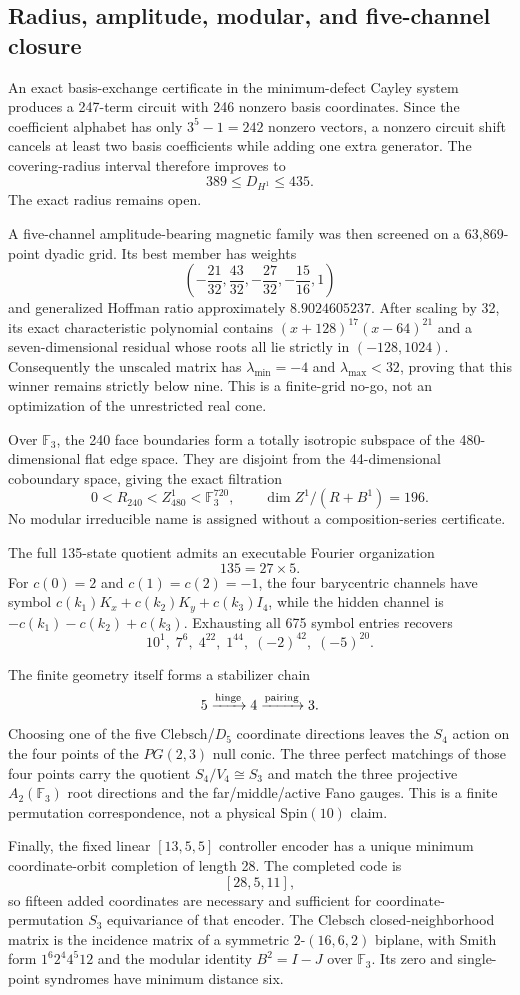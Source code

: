\subsection{Radius, amplitude, modular, and five-channel closure}
\label{sec:bt3486-3499}

An exact basis-exchange certificate in the minimum-defect Cayley system produces a
247-term circuit with 246 nonzero basis coordinates.  Since the coefficient alphabet
has only $3^5-1=242$ nonzero vectors, a nonzero circuit shift cancels at least two
basis coefficients while adding one extra generator.  The covering-radius interval
therefore improves to
\[
  \boxed{389\leq D_{H^1}\leq435}.
\]
The exact radius remains open.

A five-channel amplitude-bearing magnetic family was then screened on a 63,869-point
dyadic grid.  Its best member has weights
\[
 \left(-\frac{21}{32},\frac{43}{32},-\frac{27}{32},-\frac{15}{16},1\right)
\]
and generalized Hoffman ratio approximately $8.9024605237$.  After scaling by 32,
its exact characteristic polynomial contains $(x+128)^{17}(x-64)^{21}$ and a
seven-dimensional residual whose roots all lie strictly in $(-128,1024)$.
Consequently the unscaled matrix has $\lambda_{\min}=-4$ and
$\lambda_{\max}<32$, proving that this winner remains strictly below nine.  This is
a finite-grid no-go, not an optimization of the unrestricted real cone.

Over $\mathbb F_3$, the 240 face boundaries form a totally isotropic subspace of the
480-dimensional flat edge space.  They are disjoint from the 44-dimensional
coboundary space, giving the exact filtration
\[
  0<R_{240}<Z^1_{480}<\mathbb F_3^{720},\qquad
  \dim Z^1/(R+B^1)=196.
\]
No modular irreducible name is assigned without a composition-series certificate.

The full 135-state quotient admits an executable Fourier organization
\[
  135=27\times5.
\]
For $c(0)=2$ and $c(1)=c(2)=-1$, the four barycentric channels have symbol
$c(k_1)K_x+c(k_2)K_y+c(k_3)I_4$, while the hidden channel is
$-c(k_1)-c(k_2)+c(k_3)$.  Exhausting all 675 symbol entries recovers
\[
  10^1,\;7^6,\;4^{22},\;1^{44},\;(-2)^{42},\;(-5)^{20}.
\]

The finite geometry itself forms a stabilizer chain
\[
  5\xrightarrow{\rm hinge}4\xrightarrow{\rm pairing}3.
\]
Choosing one of the five Clebsch/$D_5$ coordinate directions leaves the $S_4$
action on the four points of the $PG(2,3)$ null conic.  The three perfect matchings
of those four points carry the quotient $S_4/V_4\cong S_3$ and match the three
projective $A_2(\mathbb F_3)$ root directions and the far/middle/active Fano gauges.
This is a finite permutation correspondence, not a physical $\mathrm{Spin}(10)$
claim.

Finally, the fixed linear $[13,5,5]$ controller encoder has a unique minimum
coordinate-orbit completion of length 28.  The completed code is
\[
  \boxed{[28,5,11]},
\]
so fifteen added coordinates are necessary and sufficient for coordinate-permutation
$S_3$ equivariance of that encoder.  The Clebsch closed-neighborhood matrix is the
incidence matrix of a symmetric $2$-$(16,6,2)$ biplane, with Smith form
$1^6 2^4 4^5 12$ and the modular identity $B^2=I-J$ over $\mathbb F_3$.
Its zero and single-point syndromes have minimum distance six.
